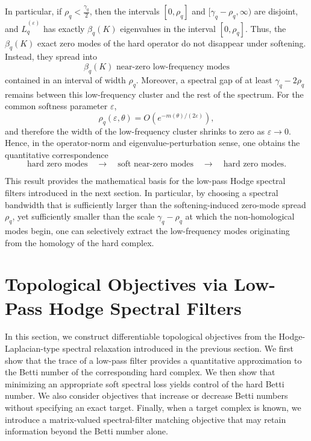 \documentclass[pdflatex,sn-mathphys-num]{sn-jnl}%
\theoremstyle{thmstyleone}%
\theoremstyle{thmstyletwo}%
\theoremstyle{thmstylethree}%
\begin{document}
In particular, if $\rho_q<\frac{\gamma_q}{2}$,
then the intervals $[0,\rho_q]$
and $[\gamma_q-\rho_q,\infty)$
are disjoint, and \(\widehat L_q^{(\varepsilon)}\) has exactly $\beta_q(K)$
eigenvalues in the interval $[0,\rho_q]$.
Thus, the $\beta_q(K)$ exact zero modes of the hard operator do not disappear under softening. Instead, they spread into
\[
\boxed{
\beta_q(K)\text{ near-zero low-frequency modes}
}
\]
contained in an interval of width \(\rho_q\).
Moreover, a spectral gap of at least $\gamma_q-2\rho_q$
remains between this low-frequency cluster and the rest of the spectrum.
For the common softness parameter \(\varepsilon\),
\[
\rho_q(\varepsilon,\theta)
=
O\left(
e^{-m(\theta)/(2\varepsilon)}
\right),
\]
and therefore the width of the low-frequency cluster shrinks to zero as $\varepsilon\to0$.
Hence, in the operator-norm and eigenvalue-perturbation sense, one obtains the quantitative correspondence
\[
\text{hard zero modes}
\quad\longrightarrow\quad
\text{soft near-zero modes}
\quad\longrightarrow\quad
\text{hard zero modes}.
\]

This result provides the mathematical basis for the low-pass Hodge spectral filters introduced in the next section.
In particular, by choosing a spectral bandwidth that is sufficiently larger than the softening-induced zero-mode spread \(\rho_q\), yet sufficiently smaller than the scale \(\gamma_q-\rho_q\) at which the non-homological modes begin, one can selectively extract the low-frequency modes originating from the homology of the hard complex.






\section{Topological Objectives via Low-Pass Hodge Spectral Filters}

In this section, we construct differentiable topological objectives from the Hodge-Laplacian-type spectral relaxation introduced in the previous section.
We first show that the trace of a low-pass filter provides a quantitative approximation to the Betti number of the corresponding hard complex. We then show that minimizing an appropriate soft spectral loss yields control of the hard Betti number. We also consider objectives that increase or decrease Betti numbers without specifying an exact target. Finally, when a target complex is known, we introduce a matrix-valued spectral-filter matching objective that may retain information beyond the Betti number alone.
\end{document}
